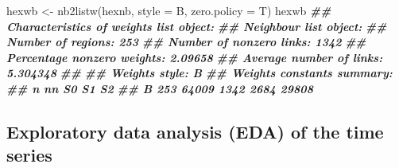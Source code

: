 \documentclass[10pt,landscape,a3paper]{article}
\newenvironment{Shaded}{\begin{snugshade}}{\end{snugshade}}
\newcommand{\AttributeTok}[1]{\textcolor[rgb]{0.77,0.63,0.00}{#1}}
\newcommand{\DocumentationTok}[1]{\textcolor[rgb]{0.56,0.35,0.01}{\textbf{\textit{#1}}}}
\newcommand{\FunctionTok}[1]{\textcolor[rgb]{0.00,0.00,0.00}{#1}}
\newcommand{\NormalTok}[1]{#1}
\newcommand{\OtherTok}[1]{\textcolor[rgb]{0.56,0.35,0.01}{#1}}
\newcommand{\StringTok}[1]{\textcolor[rgb]{0.31,0.60,0.02}{#1}}
\begin{document}
\begin{Shaded}
\begin{Highlighting}[]
\NormalTok{hexwb }\OtherTok{\textless{}{-}} \FunctionTok{nb2listw}\NormalTok{(hexnb, }\AttributeTok{style =} \StringTok{\textquotesingle{}B\textquotesingle{}}\NormalTok{, }\AttributeTok{zero.policy =}\NormalTok{ T)}
\NormalTok{hexwb}
\DocumentationTok{\#\# Characteristics of weights list object:}
\DocumentationTok{\#\# Neighbour list object:}
\DocumentationTok{\#\# Number of regions: 253 }
\DocumentationTok{\#\# Number of nonzero links: 1342 }
\DocumentationTok{\#\# Percentage nonzero weights: 2.09658 }
\DocumentationTok{\#\# Average number of links: 5.304348 }
\DocumentationTok{\#\# }
\DocumentationTok{\#\# Weights style: B }
\DocumentationTok{\#\# Weights constants summary:}
\DocumentationTok{\#\#     n    nn   S0   S1    S2}
\DocumentationTok{\#\# B 253 64009 1342 2684 29808}
\end{Highlighting}
\end{Shaded}

\hypertarget{exploratory-data-analysis-eda-of-the-time-series}{%
\subsection{Exploratory data analysis (EDA) of the time
series}\label{exploratory-data-analysis-eda-of-the-time-series}}
\end{document}
